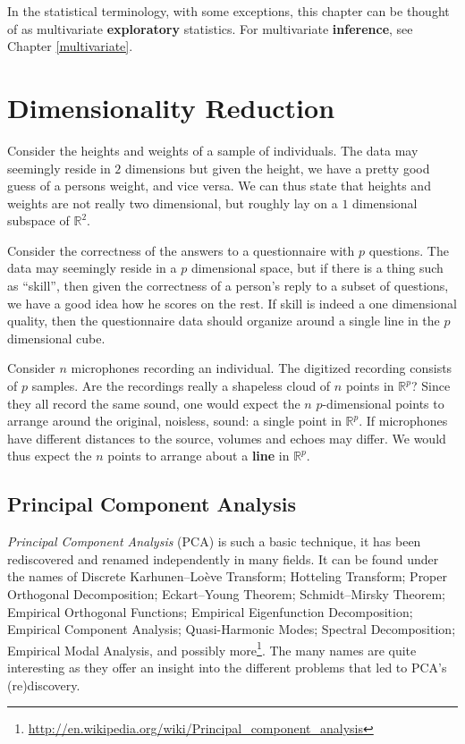 \documentclass[]{book}
\theoremstyle{definition}
\theoremstyle{definition}
\theoremstyle{definition}
\theoremstyle{remark}
\let\BeginKnitrBlock\begin \let\EndKnitrBlock\end
\begin{document}
In the statistical terminology, with some exceptions, this chapter can be thought of as multivariate \textbf{exploratory} statistics.
For multivariate \textbf{inference}, see Chapter \ref{multivariate}.

\hypertarget{dim-reduce}{%
\section{Dimensionality Reduction}\label{dim-reduce}}

\BeginKnitrBlock{example}
\protect\hypertarget{exm:bmi}{}{\label{exm:bmi} }Consider the heights and weights of a sample of individuals.
The data may seemingly reside in \(2\) dimensions but given the height, we have a pretty good guess of a persons weight, and vice versa.
We can thus state that heights and weights are not really two dimensional, but roughly lay on a \(1\) dimensional subspace of \(\mathbb{R}^2\).
\EndKnitrBlock{example}

\BeginKnitrBlock{example}
\protect\hypertarget{exm:iq}{}{\label{exm:iq} }Consider the correctness of the answers to a questionnaire with \(p\) questions.
The data may seemingly reside in a \(p\) dimensional space, but if there is a thing such as ``skill'', then given the correctness of a person's reply to a subset of questions, we have a good idea how he scores on the rest.
If skill is indeed a one dimensional quality, then the questionnaire data should organize around a single line in the \(p\) dimensional cube.
\EndKnitrBlock{example}

\BeginKnitrBlock{example}
\protect\hypertarget{exm:blind-signal}{}{\label{exm:blind-signal} }Consider \(n\) microphones recording an individual.
The digitized recording consists of \(p\) samples.
Are the recordings really a shapeless cloud of \(n\) points in \(\mathbb{R}^p\)?
Since they all record the same sound, one would expect the \(n\) \(p\)-dimensional points to arrange around the original, noisless, sound: a single point in \(\mathbb{R}^p\).
If microphones have different distances to the source, volumes and echoes may differ.
We would thus expect the \(n\) points to arrange about a \textbf{line} in \(\mathbb{R}^p\).
\EndKnitrBlock{example}

\hypertarget{pca}{%
\subsection{Principal Component Analysis}\label{pca}}

\emph{Principal Component Analysis} (PCA) is such a basic technique, it has been rediscovered and renamed independently in many fields.
It can be found under the names of
Discrete Karhunen--Loève Transform; Hotteling Transform; Proper Orthogonal Decomposition; Eckart--Young Theorem; Schmidt--Mirsky Theorem; Empirical Orthogonal Functions; Empirical Eigenfunction Decomposition; Empirical Component Analysis; Quasi-Harmonic Modes; Spectral Decomposition; Empirical Modal Analysis, and possibly more\footnote{\url{http://en.wikipedia.org/wiki/Principal_component_analysis}}.
The many names are quite interesting as they offer an insight into the different problems that led to PCA's (re)discovery.
\end{document}
